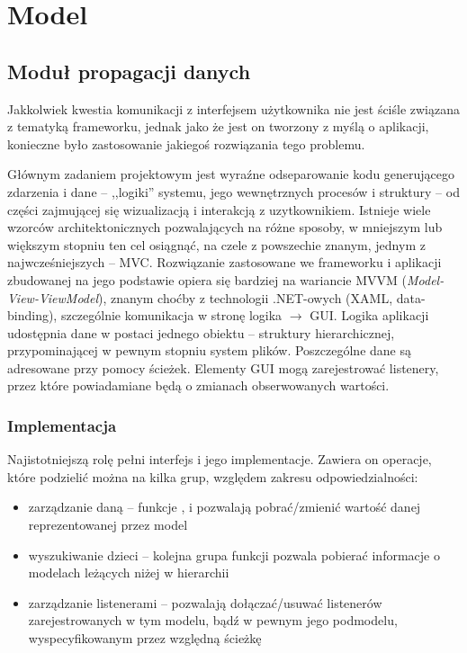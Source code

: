\chapter{Model}
\section{Moduł propagacji danych}

Jakkolwiek kwestia komunikacji z interfejsem użytkownika nie jest ściśle związana z tematyką
frameworku, jednak jako że jest on tworzony z myślą o aplikacji, konieczne było zastosowanie
jakiegoś rozwiązania tego problemu. 

Głównym zadaniem projektowym jest wyraźne odseparowanie kodu generującego zdarzenia i dane --
,,logiki'' systemu, jego wewnętrznych procesów i struktury -- od części zajmującej się wizualizacją
i interakcją z uzytkownikiem. Istnieje wiele wzorców architektonicznych pozwalających na różne
sposoby, w mniejszym lub większym stopniu ten cel osiągnąć, na czele z powszechie znanym, jednym z
najwcześniejszych -- MVC. Rozwiązanie zastosowane we frameworku i aplikacji zbudowanej na jego
podstawie opiera się bardziej na wariancie MVVM (\textit{Model-View-ViewModel}), znanym choćby z
technologii .NET-owych (XAML, data-binding), szczególnie komunikacja w stronę logika $\to$ GUI.
Logika aplikacji udostępnia dane w postaci jednego obiektu -- struktury hierarchicznej,
przypominającej w pewnym stopniu system plików. Poszczególne dane są adresowane przy pomocy ścieżek.
Elementy GUI mogą zarejestrować listenery, przez które powiadamiane będą o zmianach obserwowanych
wartości.


\subsection{Implementacja}


Najistotniejszą rolę pełni interfejs  i jego implementacje. Zawiera on operacje, które
podzielić można na kilka grup, względem zakresu odpowiedzialności:

\begin{itemize}

  \item zarządzanie daną -- funkcje ,  i  pozwalają
    pobrać\slash zmienić wartość danej reprezentowanej przez model

  \item wyszukiwanie dzieci -- kolejna grupa funkcji pozwala pobierać informacje o modelach leżących
    niżej w hierarchii

  \item zarządzanie listenerami -- pozwalają dołączać\slash usuwać listenerów zarejestrowanych w tym
    modelu, bądź w pewnym jego podmodelu, wyspecyfikowanym przez względną ścieżkę

\end{itemize}

